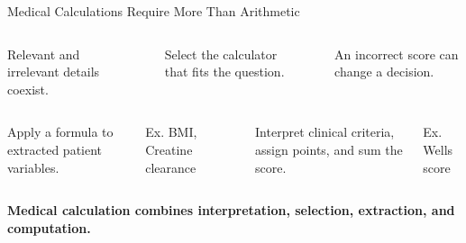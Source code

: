 \begin{frame}{Medical Calculations Require More Than Arithmetic}
  \vspace{0.18cm}
  \begin{columns}[T,onlytextwidth]
      \par\vspace{0.10cm}
      Relevant and irrelevant details coexist.
      \centering\color{RuleGray}\rule{0.5pt}{1.65cm}
      \par\vspace{0.10cm}
      Select the calculator that fits the question.
      \centering\color{RuleGray}\rule{0.5pt}{1.65cm}
      \par\vspace{0.10cm}
      An incorrect score can change a decision.
  \end{columns}
  \vspace{0.34cm}
  \centering
  \par\vspace{0.14cm}
  \begin{columns}[T,onlytextwidth]
      \par\vspace{0.08cm}
      Apply a formula to extracted patient variables.\par\vspace{0.08cm}
      Ex. BMI, Creatine clearance
      \centering\color{RuleGray}\rule{0.5pt}{1.30cm}
      \par\vspace{0.08cm}
      Interpret clinical criteria, assign points, and sum the score.\par\vspace{0.08cm}
      Ex. Wells score
  \end{columns}
  \vfill
  \centering
  {\large\bfseries\color{DeepBlue}Medical calculation combines interpretation, selection, extraction, and computation.}
\end{frame}

